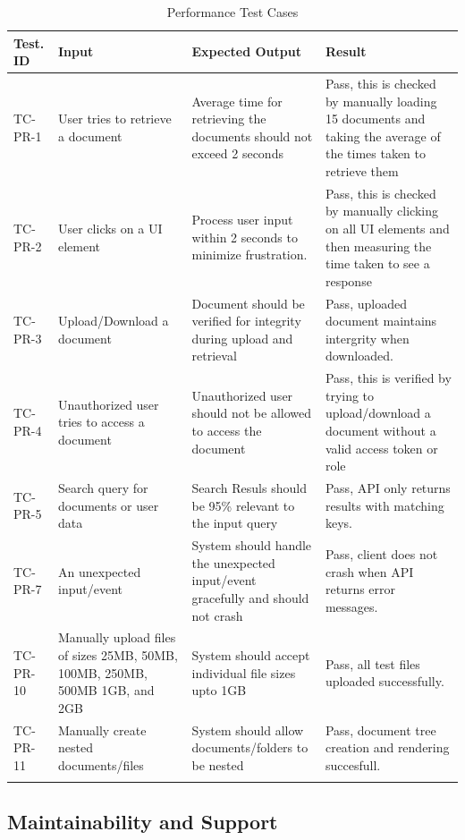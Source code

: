 \documentclass[12pt, titlepage]{article}
\begin{document}
\begin{longtable}{|m{2cm}|m{5cm}|m{4cm}|m{4cm}|}
  \hline
  \textbf{Test. ID} & \textbf{Input} & \textbf{Expected Output} &
  \textbf{Result} \\
  \hline
  TC-PR-1 & User tries to retrieve a document & Average time for
  retrieving the documents should not exceed 2
  seconds & Pass, this is checked by
  manually loading 15 documents and taking the average of the times taken
  to retrieve them\\ \hline
  TC-PR-2 & User clicks on a UI element & Process user
  input within 2 seconds to minimize frustration. & Pass, this is checked by
  manually clicking on all UI elements and then measuring the time taken to
  see a response\\ \hline
  TC-PR-3 & Upload/Download a document & Document should be verified for
  integrity during upload and retrieval & Pass, uploaded document
  maintains intergrity when downloaded.\\ \hline
  TC-PR-4 & Unauthorized user tries to access a document &
  Unauthorized user should not be allowed to access the document &
  Pass, this is verified by trying to upload/download a document
  without a valid access token or role\\ \hline
  TC-PR-5 & Search query for documents or user data & Search Resuls
  should be 95\% relevant to the input query & Pass, API only returns
  results with matching keys.\\ \hline
  TC-PR-7 & An unexpected input/event & System should handle the
  unexpected input/event gracefully and should not crash & Pass,
  client does not crash when API returns error messages.\\ \hline
  TC-PR-10 & Manually upload files of sizes 25MB, 50MB, 100MB, 250MB,
  500MB 1GB, and 2GB  & System should accept individual file sizes
  upto 1GB & Pass, all test files uploaded successfully. \\ \hline
  TC-PR-11 & Manually create nested documents/files & System should
  allow documents/folders to be nested &
  Pass, document tree creation and rendering succesfull.\\ \hline
  \caption{Performance Test Cases}
\end{longtable}

\subsection{Maintainability and Support}
\end{document}
